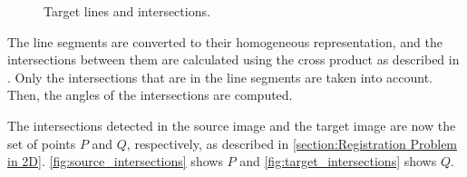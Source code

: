             \begin{figure}\centering
                \caption{Target lines and intersections.}
                \label{fig:target_intersections}
            \end{figure}

            The line segments are converted to their homogeneous representation, 
            and the intersections between them are calculated using the cross product as described in \cite{Hartley_2003_multiple_Book}.
            Only the intersections that are in the line segments are taken into account.
            Then, the angles of the intersections are computed.

            The intersections detected in the source image and the target image are now the set of points $P$ and $Q$, respectively, 
            as described in \autoref{section:Registration Problem in 2D}. 
            \autoref{fig:source_intersections} shows $P$ and \autoref{fig:target_intersections} shows $Q$.


